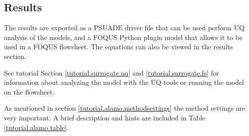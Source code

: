 \subsection{Results}
	The results are exported as a PSUADE driver file that can be used perform UQ analysis of the models, and a FOQUS Python plugin model that allows it to be used in a FOQUS flowsheet. The equations can also be viewed in the results section.
	
	See tutorial Section \ref{tutorial.surrogate.uq} and \ref{tutorial.surrogate.fs} for information about analyzing the model with the UQ tools or running the model on the flowsheet.
	
	As mentioned in section \ref{tutorial.alamo.methodsettings} the method settings are very important. A brief description and hints are included in Table \ref{tutorial.alamo.table}.

